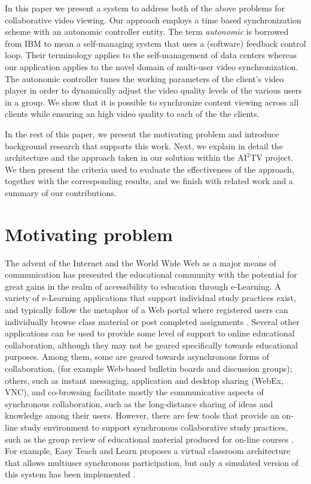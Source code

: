 \documentclass{sig-alternate}
\begin{document}
In this paper we present a system to address both of the above
problems for collaborative video viewing.  Our approach employs a time
based synchronization scheme with an autonomic controller entity.  The
term \textit{autonomic} is borrowed from IBM to mean a self-managing
system that uses a (software) feedback control loop\cite{IBM}.  Their
terminology applies to the self-management of data centers whereas our
application applies to the novel domain of multi-user video
synchronization.  The autonomic controller tunes the working
parameters of the client's video player in order to dynamically adjust
the video quality levels of the various users in a group.  We show
that it is possible to synchronize content viewing across all clients
while ensuring an high video quality to each of the the clients.

In the rest of this paper, we present the motivating problem and
introduce background research that supports this work.  Next, we
explain in detail the architecture and the approach taken in our
solution within the $\mathrm{AI}^2$TV project.  We then present the
criteria used to evaluate the effectiveness of the approach, together
with the corresponding results, and we finish with related work and a
summary of our contributions.

\section{Motivating problem} \label{background}
The advent of the Internet and the World Wide Web as a major means of
communication has presented the educational community with the
potential for great gains in the realm of accessibility to education
through e-Learning.  A variety of e-Learning applications that support
individual study practices exist, and typically follow the metaphor of
a Web portal where registered users can individually browse class
material or post completed assignments \cite{PHOENIX,CAPELLA}.
Several other applications can be used to provide some level of
support to online educational collaboration, although they may not be
geared specifically towards educational purposes.  Among them, some
are geared towards asynchronous forms of collaboration, (for example
Web-based bulletin boards and discussion groups); others, such as
instant messaging, application and desktop sharing (WebEx, VNC), and
co-browsing \cite{CAPPS, LIEBERMAN, SIDLER} facilitate mostly the
communicative aspects of synchronous collaboration, such as the
long-distance sharing of ideas and knowledge among their users.
However, there are few tools that provide an on-line study environment
to support synchronous collaborative study practices, such as the
group review of educational material produced for on-line courses
\cite{WELLS}.  For example, Easy Teach and Learn proposes a virtual
classroom architecture that allows multiuser synchronous
participation, but only a simulated version of this system has been
implemented \cite{WALTER}.
\end{document}
